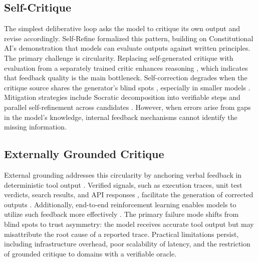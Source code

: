 \subsection{Self-Critique}%
\label{sec:self-refine}
The simplest deliberative loop asks the model to critique its own output and revise accordingly. Self-Refine \citep{madaan2023selfrefine} formalized this pattern, building on Constitutional AI's \citep{bai2022constitutional} demonstration that models can evaluate outputs against written principles. The primary challenge is circularity. Replacing self-generated critique with evaluation from a separately trained critic enhances reasoning \citep{paul2024refiner}, which indicates that feedback quality is the main bottleneck. Self-correction degrades when the critique source shares the generator's blind spots \citep{huang2023large, kamoi2024can}, especially in smaller models \citep{olausson2024self}. Mitigation strategies include Socratic decomposition into verifiable steps \citep{shi2025ssr} and parallel self-refinement across candidates \citep{wang2025learning}. However, when errors arise from gaps in the model's knowledge, internal feedback mechanisms cannot identify the missing information.
 


\subsection{Externally Grounded Critique}%
\label{sec:external-critique}

External grounding addresses this circularity by anchoring verbal feedback in deterministic tool output \citep{schick2023toolformer}. Verified signals, such as execution traces, unit test verdicts, search results, and API responses \citep{chen2024teaching, gou2024toratoolintegratedreasoningagent}, facilitate the generation of corrected outputs \citep{gou2024critic, yang2024swe, wang2024executable}. Additionally, end-to-end reinforcement learning enables models to utilize such feedback more effectively \citep{gehring2024rlef}. The primary failure mode shifts from blind spots to trust asymmetry: the model receives accurate tool output but may misattribute the root cause of a reported trace. Practical limitations persist, including infrastructure overhead, poor scalability of latency, and the restriction of grounded critique to domains with a verifiable oracle.



